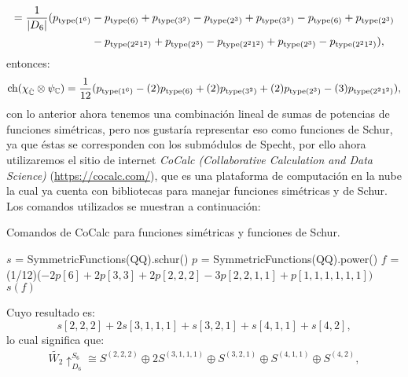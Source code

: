 \documentclass[12pt]{book}
\theoremstyle{definition}
\newcounter{in}
\begin{document}
\begin{equation*}
\begin{aligned}
=\frac{1}{|D_{6}|}(p_{\textup{type}(1^{6})} & -p_{\textup{type}(6)}  +p_{\textup{type}(3^{2})}  -p_{\textup{type}(2^{3})}  +p_{\textup{type}(3^{2})} - p_{\textup{type}(6)} + p_{\textup{type}(2^{3})}  \\
& - p_{\textup{type}(2^{2}1^{2})} + p_{\textup{type}(2^{3})} - p_{\textup{type}(2^{2}1^{2})} + p_{\textup{type}(2^{3})} - p_{\textup{type}(2^{2}1^{2})}), 
\end{aligned}
\end{equation*}
entonces:
\begin{equation*}
\textup{ch}(\chi_{\mathbb{\hat C}} \otimes \psi_{\mathbb{C}}) =\frac{1}{12}(p_{\textup{type}(1^{6})}-(2)p_{\textup{type}(6)}  + (2)p_{\textup{type}(3^{2})}  + (2)p_{\textup{type}(2^{3})} - (3)p_{\textup{type}(2^{2}1^{2})}),
\end{equation*}
con lo anterior ahora tenemos una combinación lineal de sumas de potencias de funciones simétricas, pero nos gustaría representar eso como funciones de Schur, ya que éstas se corresponden con los submódulos de Specht, por ello ahora utilizaremos el sitio de internet \textit{CoCalc (Collaborative Calculation and Data Science)} (\url{https://cocalc.com/}), que es una plataforma de computación en la nube la cual ya cuenta con bibliotecas para manejar funciones simétricas y de Schur. Los comandos utilizados se muestran a continuación:
\begin{algorithm}[H]
\caption{Comandos de CoCalc para funciones simétricas y funciones de Schur.}
\begin{algorithmic}
\STATE $s$ = SymmetricFunctions(QQ).schur()
\STATE $p$ = SymmetricFunctions(QQ).power()
\STATE $f$ = (1/12)($-2p \left [ 6 \right ] +2p \left [ 3,3 \right ]+ 2p \left [ 2,2,2 \right ]- 3p\left [ 2,2,1,1 \right ]+ p \left [ 1,1,1,1,1,1 \right ])$
\PRINT $s(f)$
\end{algorithmic}
\end{algorithm}
Cuyo resultado es:
$$s\left [ 2, 2, 2 \right ] + 2s\left [ 3, 1, 1, 1 \right ] + s\left [ 3, 2, 1 \right ] + s\left [ 4, 1, 1 \right ] + s\left [ 4, 2 \right ],$$
lo cual significa que:
\begin{equation}
\begin{aligned}
\tilde{W_{2}} \uparrow_{D_{6}}^{S_{6}}  \cong S^{(2, 2, 2)} \oplus 2S^{(3, 1, 1, 1)} \oplus S^{(3, 2, 1)} \oplus S^{(4, 1, 1)} \oplus S^{(4, 2)},
\end{aligned}
\end{equation}
\end{document}
